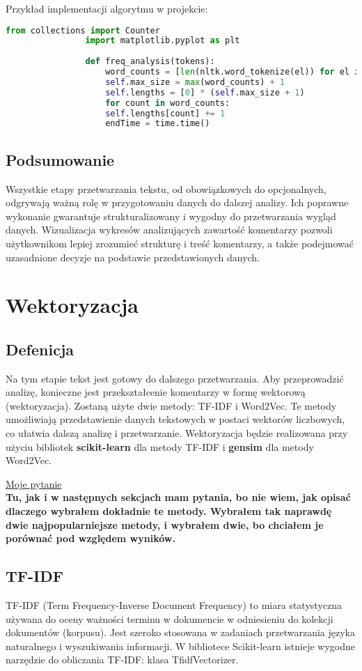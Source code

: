 			Przykład implementacji algorytmu w projekcie:
			\begin{lstlisting}[language=Python]
				from collections import Counter
				import matplotlib.pyplot as plt
				
				def freq_analysis(tokens):
					word_counts = [len(nltk.word_tokenize(el)) for el in self.nlp_data]
					self.max_size = max(word_counts) + 1
					self.lengths = [0] * (self.max_size + 1)
					for count in word_counts:
					self.lengths[count] += 1
					endTime = time.time()
			\end{lstlisting}
	
	\subsection{Podsumowanie}
		Wszystkie etapy przetwarzania tekstu, od obowiązkowych do opcjonalnych, odgrywają ważną rolę w przygotowaniu danych do dalszej analizy. Ich poprawne wykonanie gwarantuje strukturalizowany i wygodny do przetwarzania wygląd danych. Wizualizacja wykresów analizujących zawartość komentarzy pozwoli użytkownikom lepiej zrozumieć strukturę i treść komentarzy, a także podejmować uzasadnione decyzje na podstawie przedstawionych danych.
	
	
\section{Wektoryzacja}
	
	\subsection{Defenicja}
		Na tym etapie tekst jest gotowy do dalszego przetwarzania. Aby przeprowadzić analizę, konieczne jest przekształcenie komentarzy w formę wektorową (wektoryzacja). Zostaną użyte dwie metody: TF-IDF i Word2Vec. Te metody umożliwiają przedstawienie danych tekstowych w postaci wektorów liczbowych, co ułatwia dalszą analizę i przetwarzanie. Wektoryzacja będzie realizowana przy użyciu bibliotek \textbf{scikit-learn} \cite{scikit-learn} dla metody TF-IDF i \textbf{gensim} \cite{gensim} dla metody Word2Vec. 

		\underline{Moje pytanie}\\
		\textbf{Tu, jak i w następnych sekcjach mam pytania, bo nie wiem, jak opisać dlaczego wybrałem dokładnie te metody. Wybrałem tak naprawdę dwie najpopularniejsze metody, i wybrałem dwie, bo chciałem je porównać pod względem wyników.}

	
	\subsection{TF-IDF}
 		TF-IDF (Term Frequency-Inverse Document Frequency) to miara statystyczna używana do oceny ważności terminu w dokumencie w odniesieniu do kolekcji dokumentów (korpusu). Jest szeroko stosowana w zadaniach przetwarzania języka naturalnego i wyszukiwania informacji. W bibliotece Scikit-learn istnieje wygodne narzędzie do obliczania TF-IDF: klasa TfidfVectorizer. \cite{tf-idf}
		
